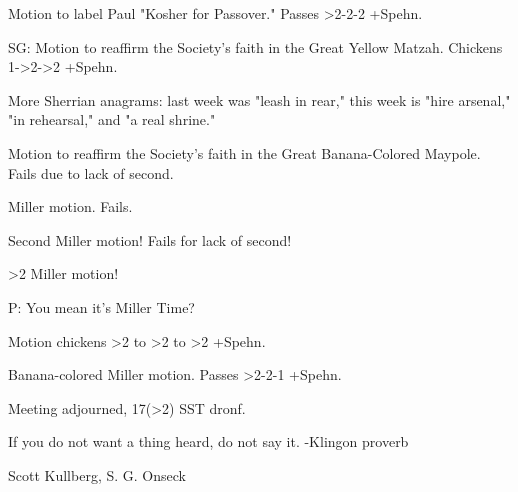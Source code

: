 \documentclass[12pt]{article}
\begin{document}
Motion to label Paul "Kosher for Passover." Passes >2-2-2 +Spehn.

SG: Motion to reaffirm the Society's faith in the Great Yellow Matzah. Chickens 1->2->2 +Spehn.

More Sherrian anagrams: last week was "leash in rear," this week is "hire arsenal," "in rehearsal," and "a real shrine."

Motion to reaffirm the Society's faith in the Great Banana-Colored Maypole. Fails due to lack of second.

Miller motion. Fails.

Second Miller motion! Fails for lack of second!

>2 Miller motion!

P: You mean it's Miller Time?

Motion chickens >2 to >2 to >2 +Spehn.

Banana-colored Miller motion. Passes >2-2-1 +Spehn.

\vspace{12pt}

\noindent
Meeting adjourned, 17(>2) SST dronf.

\vspace{18pt}

\centerline{If you do not want a thing heard, do not say it. -Klingon proverb}
\centerline{Scott Kullberg, S. G. Onseck}
\end{document}
